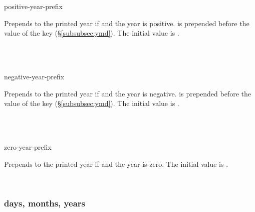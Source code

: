 \documentclass{beerydoc}
\begin{document}
\begin{codedoc}{positive-year-prefix}
  \begin{syntax}
  \end{syntax}
  Prepends  to the printed year if  and the
  year is positive.
   is prepended before the value of the key
   (\S\ref{subsubsec:ymd}).
  The initial value is .
  \begin{codedemo}
    \\
    \\
  \end{codedemo}
\end{codedoc}

\begin{codedoc}{negative-year-prefix}
  \begin{syntax}
  \end{syntax}
  Prepends  to the printed year if  and the
  year is negative.
   is prepended before the value of the key
   (\S\ref{subsubsec:ymd}).
  The initial value is .
  \begin{codedemo}
    \\
    \\
  \end{codedemo}
\end{codedoc}

\begin{codedoc}{zero-year-prefix}
  \begin{syntax}
  \end{syntax}
  Prepends  to the printed year if  and the
  year is zero.
  The initial value is .
  \begin{codedemo}
    \\
  \end{codedemo}
\end{codedoc}

\subsubsection{days, months, years}
\label{subsubsec:dates}
\end{document}
